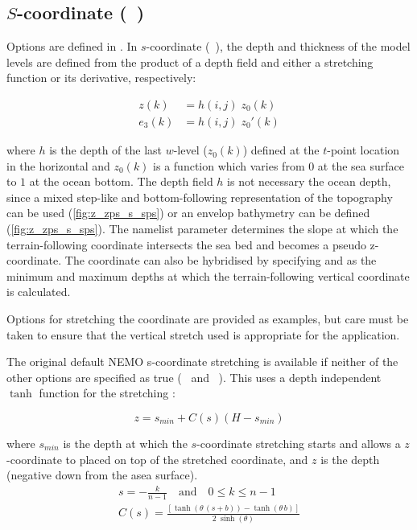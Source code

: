 \documentclass[../main/NEMO_manual]{subfiles}
\begin{document}
\subsection{$S$-coordinate (\protect{}~)}
\label{subsec:DOM_sco}
%
Options are defined in .
In $s$-coordinate (~), the depth and thickness of the model levels are defined from
the product of a depth field and either a stretching function or its derivative, respectively:

\begin{align*}
  z(k)   &= h(i,j) \; z_0 (k) \\
  e_3(k) &= h(i,j) \; z_0'(k)
\end{align*}

where $h$ is the depth of the last $w$-level ($z_0(k)$) defined at the $t$-point location in the horizontal and
$z_0(k)$ is a function which varies from $0$ at the sea surface to $1$ at the ocean bottom.
The depth field $h$ is not necessary the ocean depth,
since a mixed step-like and bottom-following representation of the topography can be used
(\autoref{fig:z_zps_s_sps}) or an envelop bathymetry can be defined (\autoref{fig:z_zps_s_sps}).
The namelist parameter  determines the slope at which
the terrain-following coordinate intersects the sea bed and becomes a pseudo z-coordinate.
The coordinate can also be hybridised by specifying  and  as
the minimum and maximum depths at which the terrain-following vertical coordinate is calculated.

Options for stretching the coordinate are provided as examples,
but care must be taken to ensure that the vertical stretch used is appropriate for the application.

The original default NEMO s-coordinate stretching is available if neither of the other options are specified as true
(~ and ~).
This uses a depth independent $\tanh$ function for the stretching \citep{Madec_al_JPO96}:

\[
  z = s_{min} + C (s) (H - s_{min})
\]

where $s_{min}$ is the depth at which the $s$-coordinate stretching starts and
allows a $z$-coordinate to placed on top of the stretched coordinate,
and $z$ is the depth (negative down from the asea surface).
\begin{gather*}
  s = - \frac{k}{n - 1} \quad \text{and} \quad 0 \leq k \leq n - 1
 \\
  C(s) = \frac{[\tanh(\theta \, (s + b)) - \tanh(\theta \, b)]}{2 \; \sinh(\theta)}
\end{gather*}
\end{document}
